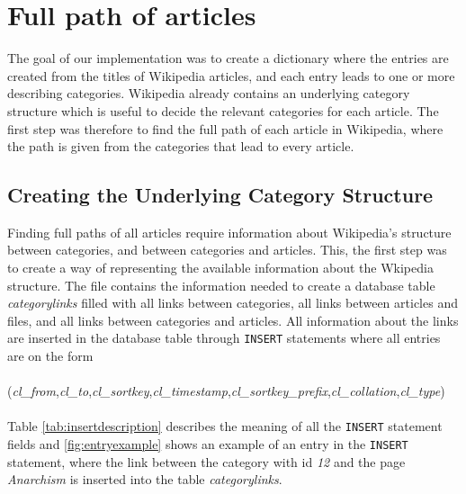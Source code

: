 \section{Full path of articles}
The goal of our implementation was to create a dictionary where the entries are created from the titles of Wikipedia articles, and each entry leads to one or more describing categories. Wikipedia already contains an underlying category structure which is useful to decide the relevant categories for each article. The first step was therefore to find the full path of each article in Wikipedia, where the path is given from the categories that lead to every article. 



\subsection{Creating the Underlying Category Structure}
Finding full paths of all articles require information about Wikipedia's structure between categories, and between categories and articles. This, the first step was to create a way of representing the available information about the Wkipedia structure. %
The file \enwikicatlink contains the information needed to create a database table \emph{categorylinks} filled with all links between categories, all links between articles and files, and all links between categories and articles. All information about the links are inserted in the database table through \texttt{INSERT} statements where all entries are on the form\\\\
(\emph{cl\_from},\emph{cl\_to},\emph{cl\_sortkey},\emph{cl\_timestamp},\emph{cl\_sortkey\_prefix},\emph{cl\_collation},\emph{cl\_type})\\\\
    Table \ref{tab:insertdescription} describes the meaning of all the \texttt{INSERT} statement fields \cite{wiki:categorylinkstable} and \ref{fig:entryexample} shows an example of an entry in the \texttt{INSERT} statement, where the link between the category with id \emph{12} and the  page \emph{Anarchism} is inserted into the table \emph{categorylinks}.  


\begin{comment}
The description of all the fields are 
the form shown in figure \ref{fig:entryform}. and an example of how that looks is shwon in figure \ref{fig:entryexample}
\begin{figure}[h]
\centering
\begin{lstlisting}
(cl_from, cl_to, cl_sortkey, cl_timestamp, cl_sortkey_prefix, cl_collation, cl_type)
\end{lstlisting}
\caption{The form of all \texttt{INSERT} statement entries}
\label{fig:entryform}
\end{figure}
\end{comment}

